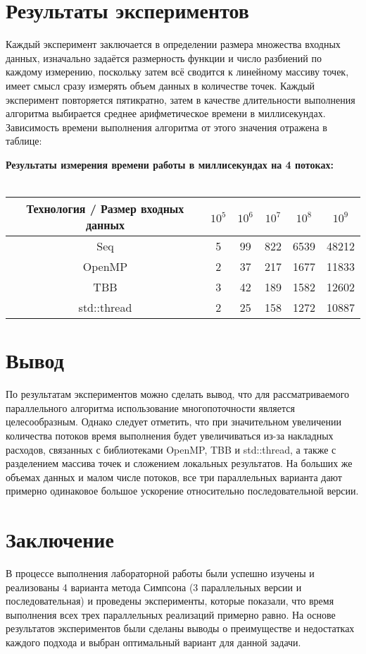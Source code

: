\documentclass[14pt, a4paper]{extarticle}
\begin{document}
  \section{Результаты экспериментов}
  Каждый эксперимент заключается в определении размера множества входных данных, изначально задаётся размерность функции и число разбиений по каждому измерению, поскольку затем всё сводится к линейному массиву точек, имеет смысл сразу измерять объем данных в количестве точек. Каждый эксперимент повторяется пятикратно, затем в качестве длительности выполнения алгоритма выбирается среднее арифметическое времени в миллисекундах. Зависимость времени выполнения алгоритма от этого значения отражена в таблице:
 
  \noindent\textbf{Результаты измерения времени работы в миллисекундах на 4 потоках:}\\\\
    \begin{tabular}{|c | c | c | c | c | c |} 
      \hline
      Технология / Размер входных данных & $10^5$ & $10^6$ & $10^7$ & $10^8$ & $10^9$ \\
      \hline
      Seq & 5 & 99  & 822 & 6539 & 48212 \\ 
      \hline
      OpenMP & 2 & 37  & 217 & 1677 & 11833 \\ 
      \hline
      TBB & 3 & 42  & 189 & 1582 & 12602 \\ 
      \hline
      std::thread & 2 & 25  & 158 & 1272 & 10887 \\ 
      \hline
    \end{tabular}

  \newpage

  \section{Вывод}
По результатам экспериментов можно сделать вывод, что для рассматриваемого параллельного алгоритма использование многопоточности является целесообразным. Однако следует отметить, что при значительном увеличении количества потоков время выполнения будет увеличиваться из-за накладных расходов, связанных с библиотеками OpenMP, TBB и std::thread, а также с разделением массива точек и сложением локальных результатов. На больших же объемах данных и малом числе потоков, все три параллельных варианта дают примерно одинаковое большое ускорение относительно последовательной версии.

  \newpage

  \section{Заключение}
В процессе выполнения лабораторной работы были успешно изучены и реализованы 4 варианта метода Симпсона (3 параллельных версии и последовательная) и проведены эксперименты, которые показали, что время выполнения всех трех параллельных реализаций примерно равно. На основе результатов экспериментов были сделаны выводы о преимуществе и недостатках каждого подхода и выбран оптимальный вариант для данной задачи.
\end{document}
